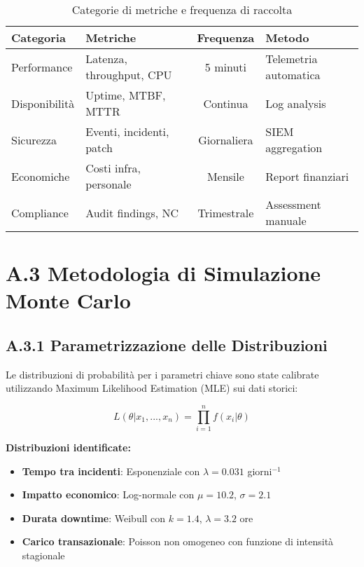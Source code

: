 \begin{table}[htbp]
\centering
\caption{Categorie di metriche e frequenza di raccolta}
\begin{tabular}{|l|l|c|l|}
\hline
\textbf{Categoria} & \textbf{Metriche} & \textbf{Frequenza} & \textbf{Metodo} \\
\hline
Performance & Latenza, throughput, CPU & 5 minuti & Telemetria automatica \\
Disponibilità & Uptime, MTBF, MTTR & Continua & Log analysis \\
Sicurezza & Eventi, incidenti, patch & Giornaliera & SIEM aggregation \\
Economiche & Costi infra, personale & Mensile & Report finanziari \\
Compliance & Audit findings, NC & Trimestrale & Assessment manuale \\
\hline
\end{tabular}
\end{table}

\section{\texorpdfstring{\textbf{A.3 Metodologia di Simulazione Monte Carlo}}{A.3 - Metodologia di Simulazione Monte Carlo}}

\subsection{\texorpdfstring{\textbf{A.3.1 Parametrizzazione delle Distribuzioni}}{A.3.1 - Parametrizzazione delle Distribuzioni}}

Le distribuzioni di probabilità per i parametri chiave sono state calibrate utilizzando Maximum Likelihood Estimation (MLE) sui dati storici:

\begin{equation}
L(\theta|x_1,...,x_n) = \prod_{i=1}^{n} f(x_i|\theta)
\end{equation}

\textbf{Distribuzioni identificate:}
\begin{itemize}
    \item \textbf{Tempo tra incidenti}: Esponenziale con $\lambda = 0.031$ giorni$^{-1}$
    \item \textbf{Impatto economico}: Log-normale con $\mu = 10.2$, $\sigma = 2.1$
    \item \textbf{Durata downtime}: Weibull con $k = 1.4$, $\lambda = 3.2$ ore
    \item \textbf{Carico transazionale}: Poisson non omogeneo con funzione di intensità stagionale
\end{itemize}

